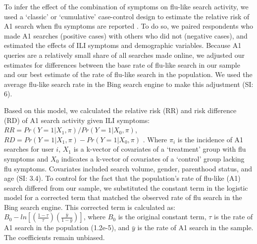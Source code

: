 \documentclass[fleqn,10pt]{wlscirep}
\begin{document}
To infer the effect of the combination of symptoms on flu-like search activity, we used a `classic' or `cumulative' case-control design to estimate the relative risk of A1 search when flu symptoms are reported \cite{king_and_zeng_2001}. To do so, we paired respondents who made A1 searches (positive cases) with others who did not (negative cases), and estimated the effects of ILI symptoms and demographic variables. Because A1 queries are a relatively small share of all searches made online, we adjusted our estimates for differences between the base rate of flu-like search in our sample and our best estimate of the rate of flu-like search in the population. We used the average flu-like search rate in the Bing search engine to make this adjustment (SI: 6).

Based on this model, we calculated the relative risk (RR) and risk difference (RD) of A1 search activity given ILI symptoms: $ RR = Pr(Y=1|X_1, \pi) / Pr(Y=1|X_0, \pi) $, $ RD = Pr(Y=1|X_1, \pi) - Pr(Y=1|X_0, \pi) $ \cite{king_and_zeng_2001}. Where $\pi_i$ is the incidence of A1 searches for user $i$, $X_1$ is a k-vector of covariates of a `treatment' group with flu symptoms and $X_0$ indicates a k-vector of covariates of a `control' group lacking flu symptoms. Covariates included search volume, gender, parenthood status, and age (SI: 3.4). To control for the fact that the population's rate of flu-like (A1) search differed from our sample, we substituted the constant term in the logistic model for a corrected term that matched the observed rate of flu search in the Bing search engine. This corrected term is calculated as: $B_0 - ln[ (\frac{1-\tau}{\tau}) (\frac{\bar{y}}{1-\bar{y}}) ]$, where $B_0$ is the original constant term, $\tau$ is the rate of A1 search in the population (1.2e-5), and $\bar{y}$ is the rate of A1 search in the sample. The coefficients remain unbiased.


\end{document}

